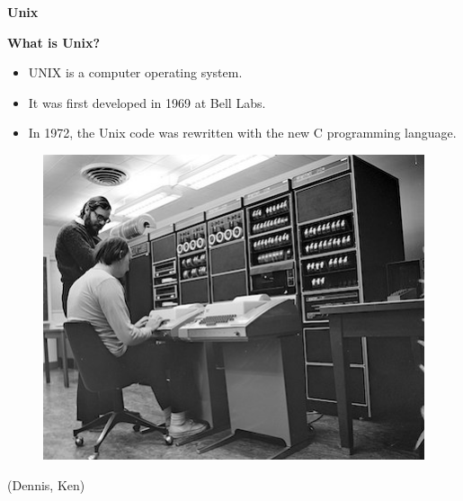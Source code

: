 \documentclass[ignorenonframetext,]{beamer}
\providecommand{\tightlist}{%
  \setlength{\itemsep}{0pt}\setlength{\parskip}{0pt}}
\begin{document}
\begin{frame}{\textbf{Unix}}

\begin{block}{\textbf{What is Unix?}}

\begin{itemize}
\tightlist
\item
  UNIX is a computer operating system.
\item
  It was first developed in 1969 at Bell Labs.
\item
  In 1972, the Unix code was rewritten with the new C programming
  language.
\end{itemize}

\begin{figure}
\centering
\includegraphics{unix_develop.jpg}
\caption{}
\end{figure}

(Dennis, Ken)

\end{block}

\end{frame}
\end{document}

